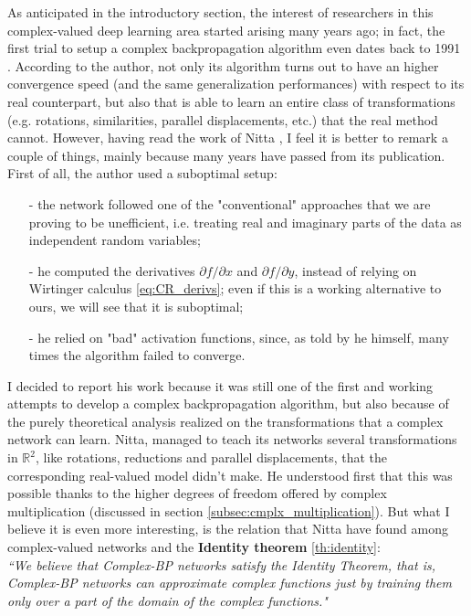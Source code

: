 \documentclass[../main.tex]{subfiles}
\begin{document}
As anticipated in the introductory section, the interest of researchers in this complex-valued deep learning area started arising many years ago; in fact, the first trial to setup a complex backpropagation algorithm even dates back to 1991 \cite{Nitta_complexBP}. According to the author, not only its algorithm turns out to have an higher convergence speed (and the same generalization performances) with respect to its real counterpart, but also that is able to learn an entire class of transformations (e.g. rotations, similarities, parallel displacements, etc.) that the real method cannot. However, having read the work of Nitta \cite{Nitta_complexBP}, I feel it is better to remark a couple of things, mainly because many years have passed from its publication. First of all, the author used a suboptimal setup:
\begin{itemize}
	\item[-] the network followed one of the "conventional" approaches that we are proving to be unefficient, i.e. treating real and imaginary parts of the data as independent random variables;
	\item[-] he computed the derivatives $\partial f/\partial x$ and $\partial f/\partial y$, instead of relying on Wirtinger calculus \ref{eq:CR_derivs}; even if this is a working alternative to ours, we will see that it is suboptimal;
	\item[-] he relied on "bad" activation functions, since, as told by he himself, many times the algorithm failed to converge.
\end{itemize}
I decided to report his work because it was still one of the first and working attempts to develop a complex backpropagation algorithm, but also because of the purely theoretical analysis realized on the transformations that a complex network can learn. Nitta, managed to teach its networks several transformations in $\mathds{R}^2$, like rotations, reductions and parallel displacements, that the corresponding real-valued model didn't	make. He understood first that this was possible thanks to the higher degrees of freedom offered by complex multiplication (discussed in section \ref{subsec:cmplx_multiplication}). But what I believe it is even more interesting, is the relation that Nitta have found among complex-valued networks and the \textbf{Identity theorem} \ref{th:identity}:\\ 
\textit{``We believe
that Complex-BP networks satisfy the Identity Theorem, that is, Complex-BP networks can approximate complex
functions just by training them only over a part of the
domain of the complex functions."}\\
\end{document}

